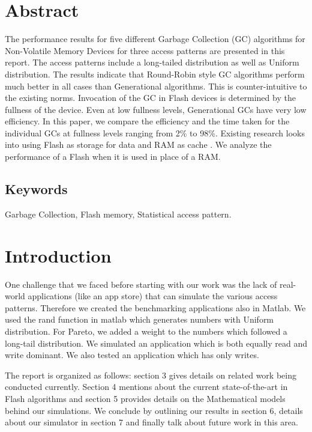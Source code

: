 \section{Abstract}
	The performance results for five different Garbage Collection (GC) algorithms for Non-Volatile Memory Devices for three access patterns are presented in this report. The access patterns include a long-tailed distribution as well as Uniform distribution. The results indicate that Round-Robin style GC algorithms perform much better in all cases than Generational algorithms. This is counter-intuitive to the existing norms. Invocation of the GC in Flash devices is determined by the fullness of the device. Even at low fullness levels, Generational GCs have very low efficiency. In this paper, we compare the efficiency and the time taken for the individual GCs at fullness levels ranging from 2\% to 98\%.  Existing research looks into using Flash as storage for data and RAM as cache \cite{Gupta09, Budilovsky11, Tjioe12}. We analyze the performance of a Flash when it is used in place of a RAM.

\subsection*{Keywords}
	Garbage Collection, Flash memory, Statistical access pattern.

\section{Introduction}
	One challenge that we faced before starting with our work was the lack of real-world applications (like an app store) that can simulate the various access patterns. Therefore we created the benchmarking applications also in Matlab. We used the rand function in matlab which generates numbers with Uniform distribution. For Pareto, we added a weight to the numbers which followed a long-tail distribution.
We simulated an application which is both equally read and write dominant. We also tested an application which has only writes.

The report is organized as follows: section 3 gives details on related work being conducted currently. Section 4 mentions about the current state-of-the-art in Flash algorithms and section 5 provides details on the Mathematical models behind our simulations. We conclude by outlining our results in section 6, details about our simulator in section 7 and finally talk about future work in this area.

